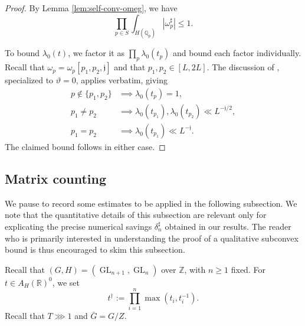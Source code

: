 \documentclass[reqno]{amsart}
\DeclareMathOperator{\GL}{GL}
\theoremstyle{plain} \newtheorem{theorem} {Theorem}
\theoremstyle{definition} \newtheorem{definition} [theorem] {Definition}
\theoremstyle{itplain} %
\numberwithin{equation}{section}
\numberwithin{theorem}{section}
\renewcommand{\geq}{\geqslant}
\renewcommand{\leq}{\leqslant}
\begin{document}
\begin{proof}
By Lemma \ref{lem:self-conv-omeg}, we have
\begin{equation*}
\prod_{p \in S} \int_{H(\mathbb{Q}_p)} |\omega_p ^\sharp| \leq 1.
\end{equation*}

To bound $\lambda_0(t)$, we factor it as $\prod_p \lambda_0(t_p)$ and bound each factor individually.  Recall that $\omega_p = \omega_p[p_1, p_2, \mathfrak{j}]$ and that $p_1, p_2 \in [L,2 L]$.  The discussion of \cite[\S6.4]{2020arXiv201202187N}, specialized to $\vartheta = 0$, applies verbatim, giving
\begin{align*}
  p \notin \{p_1, p_2 \} &\implies \lambda_0(t_p) = 1, \\
  p_1 \neq p_2 &\implies \lambda_0(t_{p_1}), \lambda_0(t_{p_2}) \ll L^{-\mathfrak{j}/2}, \\
  p_1 = p_2 &\implies \lambda_0(t_{p_1}) \ll L^{-\mathfrak{j}}.
\end{align*}
The claimed bound follows in either case.
\end{proof}

\subsection{Matrix counting}\label{sec:matrix-counting}
We pause to record some estimates to be applied in the following subsection.  We note that the quantitative details of this subsection are relevant only for explicating the precise numerical savings $\delta_n^\sharp$ obtained in our results.  The reader who is primarily interested in understanding the proof of a qualitative subconvex bound is thus encouraged to skim this subsection.

Recall that $(G,H) = (\GL_{n+1},\GL_n)$ over $\mathbb{Z}$, with $n \geq 1$ fixed.  For $t \in A_H(\mathbb{R})^0$, we set
\begin{equation*}
  t ^\dagger  := \prod_{i=1}^n \max(t_i, t_i^{-1}).
\end{equation*}
Recall that $T \ggg 1$ and $\bar{G} = G/Z$.  
\end{document}
